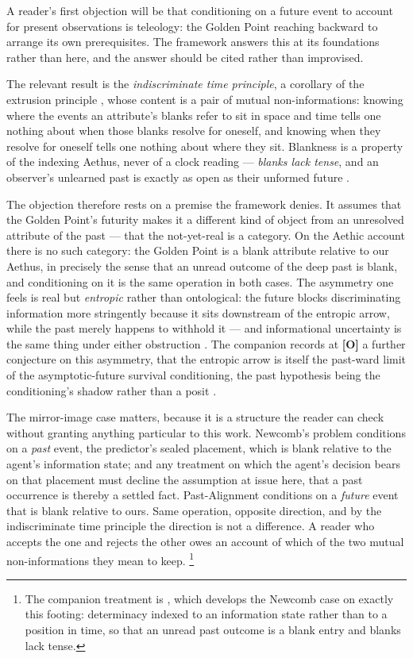 \begin{remark}
\label{gc:rem:teleology}
A reader's first objection will be that conditioning on a future event
to account for present observations is teleology: the Golden Point
reaching backward to arrange its own prerequisites. The framework
answers this at its foundations rather than here, and the answer should
be cited rather than improvised.

The relevant result is the \emph{indiscriminate time principle}, a
corollary of the extrusion principle \cite{Aethus}, whose content is a
pair of mutual non-informations: knowing where the events an attribute's
blanks refer to sit in space and time tells one nothing about when those
blanks resolve for oneself, and knowing when they resolve for oneself
tells one nothing about where they sit. Blankness is a property of the
indexing Aethus, never of a clock reading --- \emph{blanks lack tense},
and an observer's unlearned past is exactly as open as their unformed
future \cite{AethusBrief}.

The objection therefore rests on a premise the framework denies. It
assumes that the Golden Point's futurity makes it a different kind of
object from an unresolved attribute of the past --- that the not-yet-real
is a category. On the Aethic account there is no such category: the
Golden Point is a blank attribute relative to our Aethus, in precisely
the sense that an unread outcome of the deep past is blank, and
conditioning on it is the same operation in both cases. The asymmetry
one feels is real but \emph{entropic} rather than ontological: the
future blocks discriminating information more stringently because it
sits downstream of the entropic arrow, while the past merely happens to
withhold it --- and informational uncertainty is the same thing under either obstruction \cite{Aethus}. The companion records at \textbf{[O]} a further conjecture on this asymmetry, that the entropic arrow is itself the past-ward limit of the asymptotic-future survival conditioning, the past hypothesis being the conditioning's shadow rather than a posit \cite{GoldenScience2022}.

The mirror-image case matters, because it is a structure the
reader can check without granting anything particular to this work.
Newcomb's problem conditions on a \emph{past} event, the predictor's
sealed placement, which is blank relative to the agent's information
state; and any treatment on which the agent's decision bears on that
placement must decline the assumption at issue here, that a past
occurrence is thereby a settled fact. Past-Alignment conditions on a
\emph{future} event that is blank relative to ours. Same operation,
opposite direction, and by the indiscriminate time principle the
direction is not a difference. A reader who accepts the one and rejects
the other owes an account of which of the two mutual non-informations
they mean to keep.%
\footnote{The companion treatment is \cite{AethusDecision}, which develops
the Newcomb case on exactly this footing: determinacy indexed to an
information state rather than to a position in time, so that an unread past
outcome is a blank entry and blanks lack tense.}


\end{remark}
